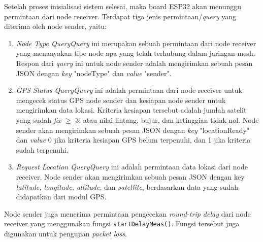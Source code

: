 Setelah proses inisialisasi sistem selesai, maka board ESP32 akan menunggu permintaan dari node receiver. Terdapat tiga jenis permintaan/\textit{query} yang diterima oleh node sender, yaitu:
\begin{enumerate}
	\item \textit{Node Type Query}\newline \textit{Query} ini merupakan sebuah permintaan dari node receiver yang menanyakan tipe node apa yang telah terhubung dalam jaringan mesh. Respon dari \textit{query} ini untuk node sender adalah mengirimkan sebuah pesan JSON dengan \textit{key} "nodeType" dan \textit{value} "sender".
	\item \textit{GPS Status Query}\newline \textit{Query} ini adalah permintaan dari node receiver untuk mengecek status GPS node sender dan kesiapan node sender untuk mengirimkan data lokasi. Kriteria kesiapan tersebut adalah jumlah satelit yang sudah \textit{fix} $\geq$ 3; atau nilai lintang, bujur, dan ketinggian tidak nol. Node sender akan mengirimkan sebuah pesan JSON dengan \textit{key} "locationReady" dan \textit{value} 0 jika kriteria kesiapan GPS belum terpenuhi, dan 1 jika kriteria sudah terpenuhi.
	\item \textit{Request Location Query}\newline \textit{Query} ini adalah permintaan data lokasi dari node receiver. Node sender akan mengirimkan sebuah pesan JSON dengan key \textit{latitude, longitude, altitude}, dan \textit{satellite}, berdasarkan data yang sudah didapatkan dari modul GPS.
\end{enumerate}
Node sender juga menerima permintaan pengecekan \textit{round-trip delay} dari node receiver yang menggunakan fungsi \verb|startDelayMeas()|. Fungsi tersebut juga digunakan untuk pengujian \textit{packet loss}.

